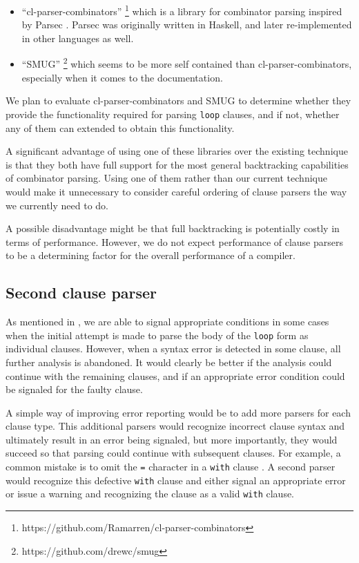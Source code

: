 \begin{itemize}
\item ``cl-parser-combinators''%
\footnote{https://github.com/Ramarren/cl-parser-combinators} which is
a library for combinator parsing inspired by Parsec
\cite{Leijen:Meijer:Parsec}.  Parsec was originally written in
Haskell, and later re-implemented in other languages as well.
\item ``SMUG''%
\footnote{https://github.com/drewc/smug} which seems to be more
self contained than cl-parser-combinators, especially when it
comes to the documentation.
\end{itemize}

We plan to evaluate cl-parser-combinators and SMUG to determine
whether they provide the functionality required for parsing
\texttt{loop} clauses, and if not, whether any of them can extended to
obtain this functionality.

A significant advantage of using one of these libraries over the
existing technique is that they both have full support for the most
general backtracking capabilities of combinator parsing.  Using one of
them rather than our current technique would make it unnecessary to
consider careful ordering of clause parsers the way we currently need
to do.

A possible disadvantage might be that full backtracking is potentially
costly in terms of performance.  However, we do not expect performance
of clause parsers to be a determining factor for the overall
performance of a \commonlisp{} compiler.

\subsection{Second clause parser}
\label{sec-second-clause-parser}

As mentioned in , we are able to signal
appropriate conditions in some cases when the initial attempt is made
to parse the body of the \texttt{loop} form as individual clauses.
However, when a syntax error is detected in some clause, all further
analysis is abandoned.  It would clearly be better if the analysis
could continue with the remaining clauses, and if an appropriate error
condition could be signaled for the faulty clause.

A simple way of improving error reporting would be to add more parsers
for each clause type.  This additional parsers would recognize
incorrect clause syntax and ultimately result in an error being
signaled, but more importantly, they would succeed so that parsing
could continue with subsequent clauses.  For example, a common mistake
is to omit the \texttt{=} character in a \texttt{with} clause
.  A second parser would recognize this defective
\texttt{with} clause and either signal an appropriate error or issue a
warning and recognizing the clause as a valid \texttt{with} clause.

